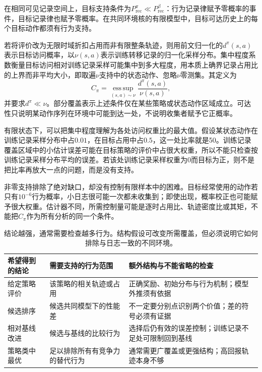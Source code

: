 \begin{definition}[支持、集中程度与部分覆盖]
  \label{def:rl-information-support}
  在相同可见记录空间上，目标支持条件为$P_{\mathrm{rec}}^\pi\ll P_{\mathrm{rec}}^\beta$：行为记录律赋予零概率的事件，目标记录律也赋予零概率。在共同环境核的有限模型中，目标可达历史上的每个目标动作都须有行为支持。

  若将评价改为无限时域折扣占用而非有限整条轨迹，则用前文归一化的$d^\pi(s,a)$表示目标访问概率，以$\nu(s,a)$表示训练转移记录的归一化采样分布。集中程度系数衡量目标访问相对训练记录采样可能集中到多大程度，用本质上确界记录占用比的上界而非平均大小，即取遍$\nu$支持中的状态动作、忽略$\nu$零测集。其定义为
  \[
    C_\pi=\operatorname*{ess\,sup}_{(s,a)\sim\nu}
               \frac{d^\pi(s,a)}{\nu(s,a)},
  \]
  并要求$d^\pi\ll\nu$。部分覆盖表示上述条件仅在某些策略或状态动作区域成立。可达性只说明某动作序列在环境中可能到达一处，不说明收集者赋予它正概率。
\end{definition}

有限状态下，可以把集中程度理解为各处访问权重比的最大值。假设某状态动作在训练记录采样分布中占$0.01$，在目标占用中占$0.5$，这一处比率就是50。训练记录覆盖区域中的小估计误差可能在目标策略的评价中占很大权重，所以不能只检查按训练记录采样分布平均的误差。若该处训练记录采样权重为0而目标为正，则不是把比率再放大一点的问题，而是没有支持。

非零支持排除了绝对缺口，却没有控制有限样本中的困难。目标经常使用的动作若只有$10^{-6}$行为概率，小日志很可能一次都未收集到；即使出现，概率校正也可能赋予很大权重。估计器不同，所需控制量可能是逐时占用比、轨迹密度比或其矩，不能把$C_\pi$作为所有分析的同一个条件。

\begin{table}[htbp]
  \centering
  \small
  \begin{tabularx}{\linewidth}{p{26mm}XX}
    \toprule
    希望得到的结论 & 需要支持的行为范围 & 额外结构与不能省略的检查 \\
    \midrule
    给定策略评价 & 该策略的相关轨迹或占用 & 正确奖励、初始分布与行为机制；模型外推须有依据 \\
    候选排序 & 候选共同模型下的性能差 & 不一定要分别点识别两个价值；差的符号必须有证据 \\
    相对基线改进 & 候选与基线的比较行为 & 选择后仍有效的误差控制；训练记录不足处可限制回到基线 \\
    策略类中最优 & 足以排除所有有竞争力的替代行为 & 通常需更广覆盖或更强结构；高回报轨迹本身不够 \\
    \bottomrule
  \end{tabularx}
  \caption{结论越强，通常需要检查越多行为。结构假设可改变所需覆盖，但必须说明它如何排除与日志一致的不同环境。}
  \label{tab:rl-information-claims}
\end{table}

